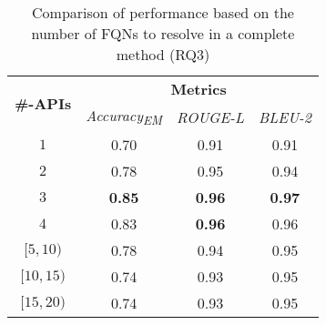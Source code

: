 \begin{table}[]
  \centering
  \small
\begin{tabular}{l|ccc}
\toprule
\multirow{2}{*}{\textbf{\#-APIs}} & \multicolumn{3}{c}{\textbf{Metrics}}                                  \\ \cline{2-4} 
                                   & \multicolumn{1}{c|}{\textit{Accuracy\textsubscript{EM}}} & \multicolumn{1}{c|}{\textit{ROUGE-L}} &  \multicolumn{1}{c}{\textit{BLEU-2}}\\ \hline
\multicolumn{1}{c|}{$1$}      & \multicolumn{1}{c|}{0.70}         & \multicolumn{1}{c|}{0.91} & 0.91           \\
\multicolumn{1}{c|}{$2$}      & \multicolumn{1}{c|}{0.78}         & \multicolumn{1}{c|}{0.95} & 0.94          \\ 
\multicolumn{1}{c|}{$3$}      & \multicolumn{1}{c|}{\textbf{0.85}}         & \multicolumn{1}{c|}{\textbf{0.96}} & \textbf{0.97}          \\ 
\multicolumn{1}{c|}{$4$}      & \multicolumn{1}{c|}{0.83}         & \multicolumn{1}{c|}{\textbf{0.96}} & 0.96        \\ 
\multicolumn{1}{c|}{$[5, 10)$}      & \multicolumn{1}{c|}{0.78}         & \multicolumn{1}{c|}{0.94} & 0.95          \\ 
\multicolumn{1}{c|}{$[10, 15)$}      & \multicolumn{1}{c|}{0.74}         & \multicolumn{1}{c|}{0.93} & 0.95          \\ 
\multicolumn{1}{c|}{$[15, 20)$}      & \multicolumn{1}{c|}{0.74}         & \multicolumn{1}{c|}{0.93} & 0.95         \\ \bottomrule
\end{tabular}
\caption{Comparison of performance based on the number of FQNs to resolve in a complete method (RQ3)}
\label{tab:strat-eval}
\end{table}
